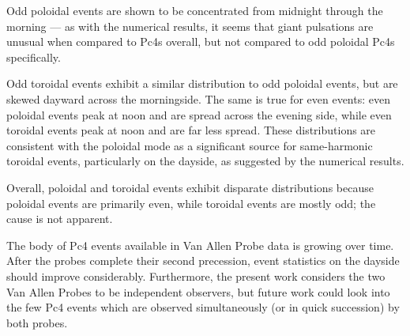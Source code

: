 \documentclass{article}
\begin{document}
Odd poloidal events are shown to be concentrated from midnight through the morning --- as with the numerical results, it seems that giant pulsations are unusual when compared to Pc4s overall, but not compared to odd poloidal Pc4s specifically.

Odd toroidal events exhibit a similar distribution to odd poloidal events, but are skewed dayward across the morningside. The same is true for even events: even poloidal events peak at noon and are spread across the evening side, while even toroidal events peak at noon and are far less spread. These distributions are consistent with the poloidal mode as a significant source for same-harmonic toroidal events, particularly on the dayside, as suggested by the numerical results.

Overall, poloidal and toroidal events exhibit disparate distributions because poloidal events are primarily even, while toroidal events are mostly odd; the cause is not apparent.

The body of Pc4 events available in Van Allen Probe data is growing over time. After the probes complete their second precession, event statistics on the dayside should improve considerably. Furthermore, the present work considers the two Van Allen Probes to be independent observers, but future work could look into the few Pc4 events which are observed simultaneously (or in quick succession) by both probes.






\end{document}
